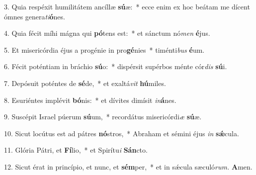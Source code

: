 \item 3. Quia respéxit humilitátem ancíllæ \textbf{sú}æ:~* ecce enim ex hoc beátam me dícent ómnes genera\textit{ti}\textbf{ó}nes.

\item 4. Quia fécit míhi mágna qui \textbf{pó}tens est:~* et sánctum nó\textit{men} \textbf{é}jus.

\item 5. Et misericórdia éjus a progénie in pro\textbf{gé}nies~* timénti\textit{bus} \textbf{é}um.

\item 6. Fécit poténtiam in bráchio \textbf{sú}o:~* dispérsit supérbos ménte cór\textit{dis} \textbf{sú}i.

\item 7. Depósuit poténtes de \textbf{sé}de,~* et exaltá\textit{vit} \textbf{hú}miles.

\item 8. Esuriéntes implévit \textbf{bó}nis:~* et dívites dimísit \textit{in}\textbf{á}nes.

\item 9. Suscépit Israel púerum \textbf{sú}um,~* recordátus misericórdi\textit{æ} \textbf{sú}æ.

\item 10. Sicut locútus est ad pátres \textbf{nó}stros,~* Abraham et sémini éjus \textit{in} \textbf{sǽ}cula.

\item 11. Glória Pátri, et \textbf{Fí}lio,~* et Spirítu\textit{i} \textbf{Sán}cto.

\item 12. Sicut érat in princípio, et nunc, et \textbf{sém}per,~* et in sǽcula sæculó\textit{rum.} \textbf{A}men.